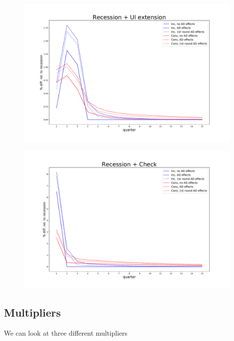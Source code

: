 \documentclass[]{article}
\begin{document}
\begin{figure}
	\centering
	\includegraphics[width=\linewidth]{../FullRun_June7th/recession_UI_relrecession}
	\caption{}
	\label{fig:recessionuirelrecession}
\end{figure}

\begin{figure}
	\centering
	\includegraphics[width=\linewidth]{../FullRun_June7th/recession_Check_relrecession}
	\caption{}
	\label{fig:recessioncheckrelrecession}
\end{figure}


\FloatBarrier
\subsection{Multipliers}

We can look at three different multipliers
\end{document}

